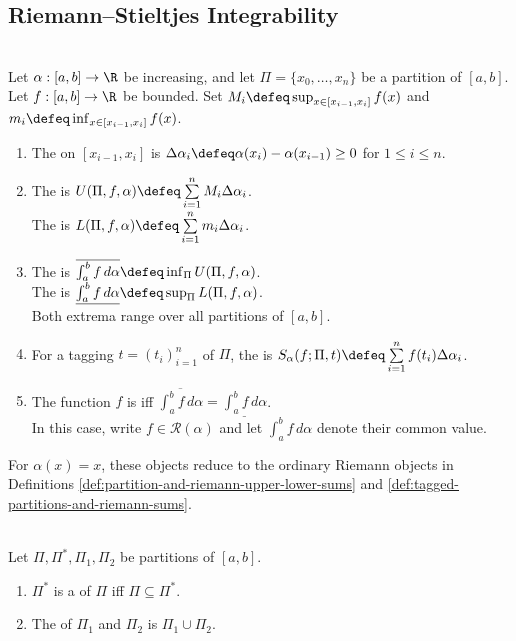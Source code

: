 \subsection{Riemann--Stieltjes Integrability}

\begin{definition} \label{def:riemann-stieltjes-integral} \\
Let $\alpha:[a,b]\to\R$ be increasing, and let $\Pi=\{x_0,\ldots,x_n\}$ be a partition of $[a,b]$.\\
Let $f:[a,b]\to\R$ be bounded. Set $M_i\defeq\sup_{x\in[x_{i-1},x_i]}f(x)$ and $m_i\defeq\inf_{x\in[x_{i-1},x_i]}f(x)$.
\begin{enumerate}[label=(\roman*)]
\setlength{\itemsep}{0pt}
\item The  on $[x_{i-1},x_i]$ is $\Delta\alpha_i\defeq\alpha(x_i)-\alpha(x_{i-1})\geq0$ for $1\leq i\leq n$.
\item The  is $U(\Pi,f,\alpha)\defeq\sum\limits_{i=1}^{n}M_i\Delta\alpha_i$.\\
The  is $L(\Pi,f,\alpha)\defeq\sum\limits_{i=1}^{n}m_i\Delta\alpha_i$.
\item The  is $\overline{\int_a^b f\,d\alpha}\defeq\inf_{\Pi}U(\Pi,f,\alpha)$.\\
The  is $\underline{\int_a^b f\,d\alpha}\defeq\sup_{\Pi}L(\Pi,f,\alpha)$.\\
Both extrema range over all partitions of $[a,b]$.
\item For a tagging $t=(t_i)_{i=1}^{n}$ of $\Pi$, the  is $S_\alpha(f;\Pi,t)\defeq\sum\limits_{i=1}^{n}f(t_i)\Delta\alpha_i$.
\item The function $f$ is  iff $\overline{\int_a^b f\,d\alpha}=\underline{\int_a^b f\,d\alpha}$.\\
In this case, write $f\in\mathcal{R}(\alpha)$ and let $\int_a^b f\,d\alpha$ denote their common value.
\end{enumerate}
For $\alpha(x)=x$, these objects reduce to the ordinary Riemann objects in Definitions \ref{def:partition-and-riemann-upper-lower-sums} and \ref{def:tagged-partitions-and-riemann-sums}.
\end{definition}

\begin{definition} \label{def:partition-refinement} \\
Let $\Pi,\Pi^\ast,\Pi_1,\Pi_2$ be partitions of $[a,b]$.
\begin{enumerate}[label=(\roman*)]
\setlength{\itemsep}{0pt}
\item $\Pi^\ast$ is a  of $\Pi$ iff $\Pi\subseteq\Pi^\ast$.
\item The  of $\Pi_1$ and $\Pi_2$ is $\Pi_1\cup\Pi_2$.
\end{enumerate}
\end{definition}

